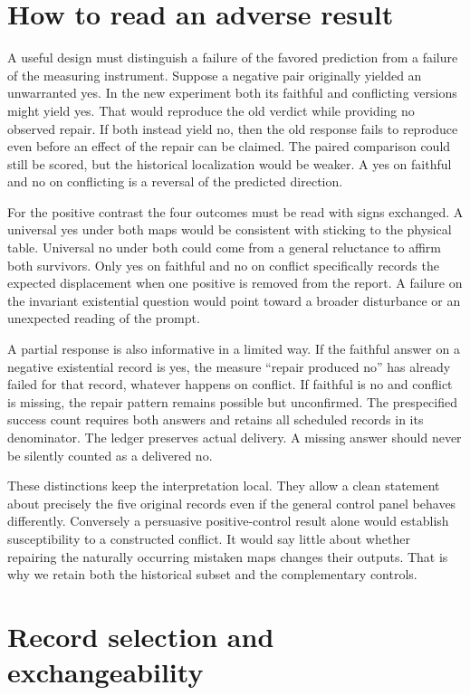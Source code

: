 \documentclass[12pt,letterpaper]{article}
\begin{document}
\clearpage\section{How to read an adverse result}

A useful design must distinguish a failure of the favored prediction from a failure of the measuring instrument. Suppose a negative pair originally yielded an unwarranted yes. In the new experiment both its faithful and conflicting versions might yield yes. That would reproduce the old verdict while providing no observed repair. If both instead yield no, then the old response fails to reproduce even before an effect of the repair can be claimed. The paired comparison could still be scored, but the historical localization would be weaker. A yes on faithful and no on conflicting is a reversal of the predicted direction.

For the positive contrast the four outcomes must be read with signs exchanged. A universal yes under both maps would be consistent with sticking to the physical table. Universal no under both could come from a general reluctance to affirm both survivors. Only yes on faithful and no on conflict specifically records the expected displacement when one positive is removed from the report. A failure on the invariant existential question would point toward a broader disturbance or an unexpected reading of the prompt.

A partial response is also informative in a limited way. If the faithful answer on a negative existential record is yes, the measure ``repair produced no'' has already failed for that record, whatever happens on conflict. If faithful is no and conflict is missing, the repair pattern remains possible but unconfirmed. The prespecified success count requires both answers and retains all scheduled records in its denominator. The ledger preserves actual delivery. A missing answer should never be silently counted as a delivered no.

These distinctions keep the interpretation local. They allow a clean statement about precisely the five original records even if the general control panel behaves differently. Conversely a persuasive positive-control result alone would establish susceptibility to a constructed conflict. It would say little about whether repairing the naturally occurring mistaken maps changes their outputs. That is why we retain both the historical subset and the complementary controls.

\clearpage\section{Record selection and exchangeability}
\end{document}
